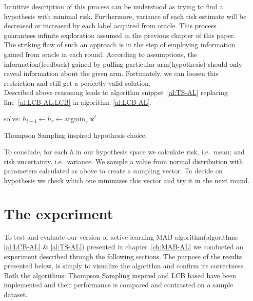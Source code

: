 \documentclass[12pt, a4paper, pdflatex, leqno, twoside]{report}
\begin{document}
Intuitive description of this process can be understood as trying to find a 
hypothesis with minimal risk. Furthermore, variance of each risk estimate will 
be decreased or increased by each label acquired from oracle. This process 
guarantees infinite exploration assumed in the previous chapter of this paper.\\
The striking flaw of such an approach is in the step of employing information 
gained from oracle in each round. According to assumptions, the information(feedback) gained by pulling particular arm(hypothesis) should only reveal 
information about the given arm. Fortunately, we can loosen this restriction and 
still get a perfectly valid solution.\\

Described above reasoning leads to algorithm snippet~\ref{al:TS-AL} replacing 
line~\ref{al:LCB-AL:LCB} in algorithm~\ref{al:LCB-AL}.


\vspace{2cm}
\begin{algorithm}[H]
  solve: $h_{t+1} \leftarrow h_r \leftarrow \text{argmin}_{r} \text{~} 
\mathbf{x}^t$\;
 \caption{Thompson Sampling inspired hypothesis choice.\label{al:TS-AL}}
\end{algorithm}
\vspace{2cm}

To conclude, for each $h$ in our hypothesis space we calculate risk, i.e.\ mean; and 
risk uncertainty, i.e.\ variance. We sample a value from normal distribution with 
parameters calculated as above to create a sampling vector. To decide on 
hypothesis we check which one minimizes this vector and try it in the next round.\\






\chapter{The experiment}
To test and evaluate our version of active learning MAB algorithm(algorithms \ref{al:LCB-AL} \& \ref{al:TS-AL}) presented in chapter~\ref{ch:MAB-AL} we conducted an 
experiment described through the following sections. The purpose of the results 
presented below, is simply to visualize the algorithm and confirm its correctness. 
Both the algorithms: Thompson Sampling inspired and LCB based have been implemented and their performance is compared and contrasted on a sample dataset. \\
\end{document}
